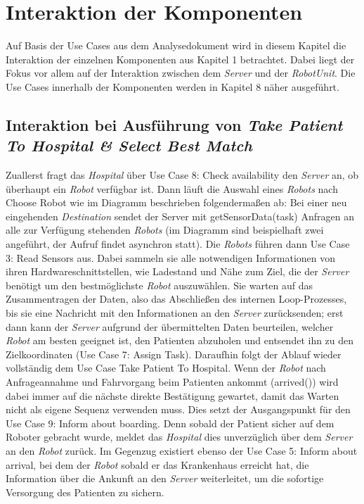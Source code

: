 \section{Interaktion der Komponenten}
Auf Basis der Use Cases aus dem Analysedokument wird in diesem Kapitel die Interaktion der einzelnen Komponenten aus Kapitel 1 betrachtet. Dabei liegt der Fokus vor allem auf der Interaktion zwischen dem \emph{Server} und der \emph{RobotUnit}. Die Use Cases innerhalb der Komponenten werden in Kapitel 8 näher ausgeführt. \\


\subsection*{Interaktion bei Ausführung von \emph{Take Patient To Hospital \& Select Best Match}}

Zuallerst fragt das \emph{Hospital} über Use Case 8: Check availability den \emph{Server} an, ob überhaupt ein \emph{Robot} verfügbar ist. Dann läuft die Auswahl eines \emph{Robots} nach Choose Robot wie im Diagramm beschrieben folgendermaßen ab: Bei einer neu eingehenden \emph{Destination} sendet der Server mit getSensorData(task) Anfragen an alle zur Verfügung stehenden \emph{Robots} (im Diagramm sind beispielhaft zwei angeführt, der Aufruf findet asynchron statt). Die \emph{Robots} führen dann Use Case 3: Read Sensors aus. Dabei sammeln sie alle notwendigen Informationen von ihren Hardwareschnittstellen, wie Ladestand und Nähe zum Ziel, die der \emph{Server} benötigt um den bestmöglichste \emph{Robot} auszuwählen. Sie warten auf das Zusammentragen der Daten, also das Abschließen des internen Loop-Prozesses, bis sie eine Nachricht mit den Informationen an den \emph{Server} zurücksenden; erst dann kann der \emph{Server} aufgrund der übermittelten Daten beurteilen, welcher \emph{Robot} am besten geeignet ist, den Patienten abzuholen und entsendet ihn zu den Zielkoordinaten (Use Case 7: Assign Task). Daraufhin folgt der Ablauf wieder vollständig dem Use Case Take Patient To Hospital. Wenn der \emph{Robot} nach Anfrageannahme und Fahrvorgang beim Patienten ankommt (arrived()) wird dabei immer auf die nächste direkte Bestätigung gewartet, damit das Warten nicht als eigene Sequenz verwenden muss. Dies setzt der Ausgangspunkt für den Use Case 9: Inform about boarding. Denn sobald der Patient sicher auf dem Roboter gebracht wurde, meldet das \emph{Hospital} dies unverzüglich über dem \emph{Server} an den \emph{Robot} zurück. Im Gegenzug existiert ebenso der Use Case 5: Inform about arrival, bei dem der \emph{Robot} sobald er das Krankenhaus erreicht hat, die Information über die Ankunft an den \emph{Server} weiterleitet, um die sofortige Versorgung des Patienten zu sichern.

